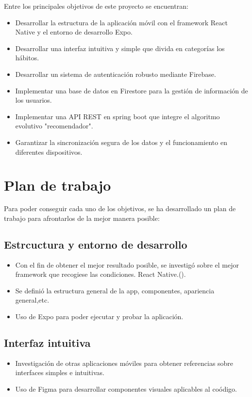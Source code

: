 Entre los principales objetivos de este proyecto se encuentran:
\begin{itemize}
    \item Desarrollar la estructura de la aplicación móvil con el framework React Native y el entorno de desarrollo Expo.
    \item Desarrollar una interfaz intuitiva y simple que divida en categorías los hábitos.
    \item Desarrollar un sistema de autenticación robusto mediante Firebase.
    \item Implementar una base de datos en Firestore para la gestión de información de los usuarios.
    \item Implementar una API REST en spring boot que integre el algoritmo evolutivo "recomendador".
    \item Garantizar la sincronización segura de los datos y el funcionamiento en diferentes dispositivos.
\end{itemize}
    

\section{Plan de trabajo}
Para poder conseguir cada uno de los objetivos, se ha desarrollado un plan de trabajo para afrontarlos de la mejor manera posible:
\subsection{Estrcuctura y entorno de desarrollo}
\begin{itemize}
    \item Con el fin de obtener el mejor resultado posible, se investigó sobre el mejor framework que recogiese las condiciones. React Native.(\cite{info_framework}).
    \item Se definió la estructura general de la app, componentes, apariencia general,etc.
    \item Uso de Expo para poder ejecutar y probar la aplicación.
\end{itemize}

\subsection{Interfaz intuitiva}
\begin{itemize}
    \item Investigación de otras aplicaciones móviles para obtener referencias sobre interfaces simples e intuitivas.
    \item Uso de Figma para desarrollar componentes visuales aplicables al coódigo.
\end{itemize}

